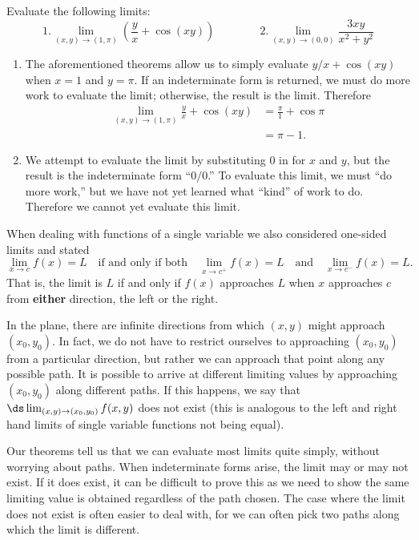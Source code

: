 \begin{example}\label{ex_multilimit3}%
Evaluate the following limits:
\[1. \lim_{(x,y)\to (1,\pi)}\left(\frac yx+\cos(xy)\right)\qquad\qquad 2. \lim_{(x,y)\to (0,0)} \frac{3xy}{x^2+y^2}\]
\solution
\begin{enumerate}
	\item The aforementioned theorems allow us to simply evaluate $y/x+\cos(xy)$ when $x=1$ and $y=\pi$. If an indeterminate form is returned, we must do more work to evaluate the limit; otherwise, the result is the limit. Therefore
	\begin{align*}
	\lim_{(x,y)\to (1,\pi)} \frac yx + \cos(xy)  &= \frac\pi{1}+\cos \pi \\
		&= \pi -1.
	\end{align*}
	\item		We attempt to evaluate the limit by substituting 0 in for $x$ and $y$, but the result is the indeterminate form ``$0/0$.'' To evaluate this limit, we must ``do more work,'' but we have not yet learned what ``kind'' of work to do. Therefore we cannot yet evaluate this limit.
\end{enumerate}
\end{example}

When dealing with functions of a single variable we also considered one-sided limits and stated
\[
\lim_{x\to c}f(x) = L
\quad\text{if and only if both}\quad
\lim_{x\to c^+}f(x) =L \quad\text{and}\quad \lim_{x\to c^-}f(x) =L.
\]
That is, the limit is $L$ if and only if $f(x)$ approaches $L$ when $x$ approaches $c$ from \textbf{either} direction, the left or the right.

In the plane, there are infinite directions from which $(x,y)$ might approach $(x_0,y_0)$. In fact, we do not have to restrict ourselves to approaching $(x_0,y_0)$ from a particular direction, but rather we can approach that point along any possible path. It is possible to arrive at different limiting values by approaching $(x_0,y_0)$ along different paths. If this happens, we say that $\ds \lim_{(x,y)\to(x_0,y_0) } f(x,y)$ does not exist (this is analogous to the left and right hand limits of single variable functions not being equal).

Our theorems tell us that we can evaluate most limits quite simply, without worrying about  paths. When indeterminate forms arise, the limit may or may not exist. If it does exist, it can be difficult to prove this as we need to show the same limiting value is obtained regardless of the path chosen. The case where the limit does not exist is often easier to deal with, for we can often pick two paths along which the limit is different.


